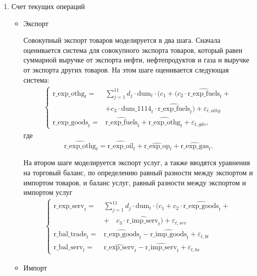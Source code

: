 \documentclass[a4paper, 14pt]{extarticle}
\newcommand{\lsum}{\sum\limits}
\renewcommand{\labelitemiii}{$\textcolor{violet}{\diamond}$}
\begin{document}
\newpage
\begin{enumerate}
	\item Счет текущих операций
	\begin{itemize}[label = \labelitemiii]
		\item Экспорт
		
		Совокупный экспорт товаров моделируется в два шага.
		Сначала оценивается система для совокупного экспорта товаров, который равен суммарной выручке от экспорта нефти, нефтепродуктов и газа и выручке от экспорта других товаров. 
		На этом шаге оценивается следующая система:
		\begin{align*}
		\begin{cases}        
		\text{r\_exp\_othg}_t =& \lsum_{j = 1}^{11} d_j \cdot \text{dum}_t \cdot (c_1 +
		(c_2 \cdot \widehat{\text{r\_exp\_fuels}}_t +  \\
		& + c_3 \cdot \text{dum\_1114}_t \cdot \widehat{\text{r\_exp\_fuels}}_t) + 
		\varepsilon_{t, othg} \\
		\text{r\_exp\_goods}_t =& \widehat{\text{r\_exp\_fuels}}_t + \widehat{\text{r\_exp\_othg}}_t + \varepsilon_{t, gds},
		\end{cases}
		\end{align*}
		где 
		\[
		 \widehat{\text{r\_exp\_othg}}_t =\widehat{\text{r\_exp\_oil}}_t + \widehat{\text{r\_exp\_op}}_t + \widehat{\text{r\_exp\_gas}}_t.
		\]
		
		На втором шаге моделируется экспорт услуг, а также вводятся уравнения на торговый баланс, по определению равный разности между экспортом и импортом товаров, и баланс услуг, равный разности между экспортом и импортом услуг
\begin{align*}	
		\begin{cases}        
			\text{r\_exp\_serv}_t =& \lsum_{j = 1}^{11} d_j \cdot \text{dum}_t \cdot (c_1 + c_2 \cdot \widehat{\text{r\_exp\_goods}}_t + \\ &
			+ \quad c_3 \cdot \widehat{\text{r\_imp\_serv}}_t) + \varepsilon_{t, srv}\\
			\text{r\_bal\_trade}_t =& \widehat{\text{r\_exp\_goods}}_t - \widehat{\text{r\_imp\_goods}}_t + \varepsilon_{t, bt}\\
			\text{r\_bal\_serv}_t =& \widehat{\text{r\_exp\_serv}}_t - \widehat{\text{r\_imp\_serv}}_t + \varepsilon_{t, bs}
		\end{cases}
	\end{align*}
		 
		\item Импорт
		

\end{itemize}
\end{enumerate}
\end{document}
